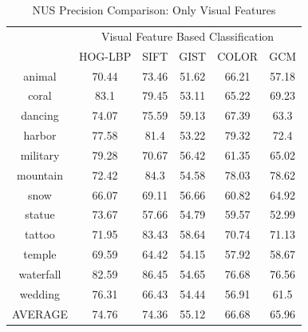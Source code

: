 \begin{table}
\centering
\caption{ NUS Precision Comparison: Only Visual Features} %
\vspace*{0.2 cm}
\begin{tabular}{| c | c | c | c | c | c |}
\hline
 {\multirow{2}{*}{Labels}} & \multicolumn{5}{|c|}{Visual Feature Based Classification} \\
 \cline{2-6}
  & HOG-LBP & SIFT & GIST & COLOR & GCM \\  [1ex] \hline
animal & 70.44 & 73.46 & 51.62 & 66.21 & 57.18 \\  [1ex] \hline
coral & 83.1 & 79.45 & 53.11 & 65.22 & 69.23 \\  [1ex] \hline
dancing & 74.07 & 75.59 & 59.13 & 67.39 & 63.3 \\  [1ex] \hline
harbor & 77.58 & 81.4 & 53.22 & 79.32 & 72.4 \\  [1ex] \hline
military & 79.28 & 70.67 & 56.42 & 61.35 & 65.02 \\  [1ex] \hline
mountain & 72.42 & 84.3 & 54.58 & 78.03 & 78.62 \\  [1ex] \hline
snow & 66.07 & 69.11 & 56.66 & 60.82 & 64.92 \\  [1ex] \hline
statue & 73.67 & 57.66 & 54.79 & 59.57 & 52.99 \\  [1ex] \hline
tattoo & 71.95 & 83.43 & 58.64 & 70.74 & 71.13 \\  [1ex] \hline
temple & 69.59 & 64.42 & 54.15 & 57.92 & 58.67 \\  [1ex] \hline
waterfall & 82.59 & 86.45 & 54.65 & 76.68 & 76.56 \\  [1ex] \hline
wedding & 76.31 & 66.43 & 54.44 & 56.91 & 61.5 \\  [1ex] \hline
AVERAGE & 74.76 & 74.36 & 55.12 & 66.68 & 65.96 \\  [1ex] \hline
\end{tabular}
\label{NUSPrecisionVisual} %
\end{table}

